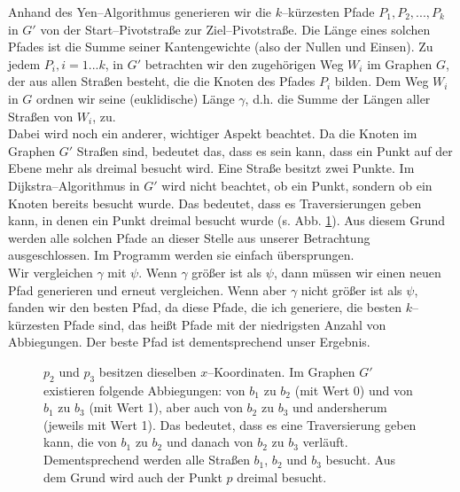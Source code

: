 \documentclass[a4paper,10pt,ngerman]{scrartcl}
\begin{document}
Anhand des Yen--Algorithmus generieren wir die $k$--kürzesten Pfade $P_1, P_2, ..., P_k$ in $G'$
von der Start--Pivotstraße zur Ziel--Pivotstraße.
Die Länge eines solchen Pfades ist die Summe seiner Kantengewichte (also der Nullen und Einsen).
Zu jedem $P_i, i=1...k$, in $G'$ betrachten wir den zugehörigen Weg $W_i$ im Graphen $G$,
der aus allen Straßen besteht, die die Knoten des Pfades $P_i$ bilden.
Dem Weg $W_i$ in $G$ ordnen wir seine (euklidische) Länge $\gamma$, d.h. die Summe der Längen aller Straßen von $W_i$, zu.\\
Dabei wird noch ein anderer, wichtiger Aspekt beachtet. Da die Knoten im Graphen $G'$
Straßen sind, bedeutet das, dass es sein kann, dass ein Punkt auf der Ebene mehr als dreimal besucht wird.
Eine Straße besitzt zwei Punkte. Im Dijkstra–Algorithmus in $G'$ wird nicht beachtet, ob ein Punkt, sondern
ob ein Knoten bereits besucht wurde. Das bedeutet, dass es Traversierungen geben kann, in denen
ein Punkt dreimal besucht wurde (s. Abb. \ref{dreimal.besuchen}).
Aus diesem Grund werden alle solchen Pfade an dieser Stelle aus unserer Betrachtung ausgeschlossen.
Im Programm werden sie einfach übersprungen.\\
Wir vergleichen $\gamma$ mit $\psi$. 
Wenn $\gamma$ größer ist als $\psi$, dann müssen wir einen neuen Pfad generieren und erneut vergleichen.
Wenn aber $\gamma$ nicht größer ist als $\psi$, fanden wir den besten Pfad, da diese Pfade, die ich generiere,
die besten $k$–kürzesten Pfade sind, das heißt Pfade mit der niedrigsten Anzahl von Abbiegungen.
Der beste Pfad ist dementsprechend unser Ergebnis.\\

\begin{figure}[h] \centerline {
} 
\caption{$p_2$ und $p_3$ besitzen dieselben $x$--Koordinaten. Im Graphen $G'$ existieren folgende Abbiegungen:
von $b_1$ zu $b_2$ (mit Wert 0) und von $b_1$ zu $b_3$ (mit Wert 1), aber auch von $b_2$ zu $b_3$ und andersherum
(jeweils mit Wert 1).
Das bedeutet, dass es eine Traversierung geben kann, die von $b_1$ zu $b_2$ und danach von $b_2$ zu $b_3$ verläuft. Dementsprechend werden alle Straßen $b_1$, $b_2$ und $b_3$ besucht.
Aus dem Grund wird auch der Punkt $p$ dreimal besucht. }
\label{dreimal.besuchen}
\end{figure}
\end{document}
